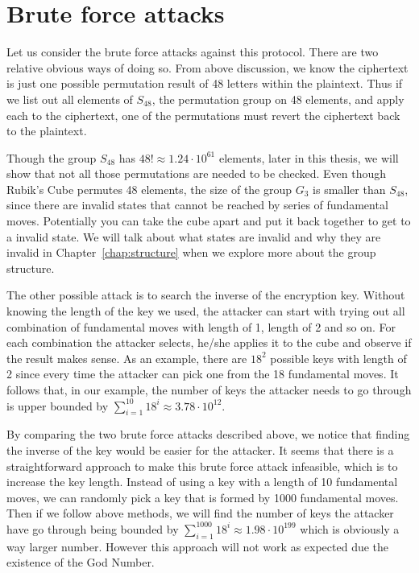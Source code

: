 \section{Brute force attacks}
\par Let us consider the brute force attacks against this protocol. There are two relative obvious ways of doing so. From above discussion, we know the ciphertext is just one possible permutation result of 48 letters within the plaintext. Thus if we list out all elements of $S_{48}$, the permutation group on 48 elements, and apply each to the ciphertext, one of the permutations must revert the ciphertext back to the plaintext.
\par Though the group $S_{48}$ has $48! \approx 1.24 \cdot 10^{61}$ elements, later in this thesis, we will show that not all those permutations are needed to be checked. Even though Rubik's Cube permutes 48 elements, the size of the group $G_3$ is smaller than $S_{48}$, since there are invalid states that cannot be reached by series of fundamental moves. Potentially you can take the cube apart and put it back together to get to a invalid state. We will talk about what states are invalid and why they are invalid in Chapter~\ref{chap:structure} when we explore more about the group structure.
\par The other possible attack is to search the inverse of the encryption key. Without knowing the length of the key we used, the attacker can start with trying out all combination of fundamental moves with length of 1, length of 2 and so on. For each combination the attacker selects, he/she applies it to the cube and observe if the result makes sense. As an example, there are $18^2$ possible keys with length of 2 since every time the attacker can pick one from the 18 fundamental moves. It follows that, in our example, the number of keys the attacker needs to go through is upper bounded by $\sum_{i=1}^{10}18^i \approx 3.78 \cdot 10^{12}$.
\par By comparing the two brute force attacks described above, we notice that finding the inverse of the key would be easier for the attacker. It seems that there is a straightforward approach to make this brute force attack infeasible, which is to increase the key length. Instead of using a key with a length of 10 fundamental moves, we can randomly pick a key that is formed by 1000 fundamental moves. Then if we follow above methods, we will find the number of keys the attacker have go through being bounded by $\sum_{i=1}^{1000}18^i \approx 1.98 \cdot 10^{199}$ which is obviously a way larger number. However this approach will not work as expected due the existence of the God Number.

